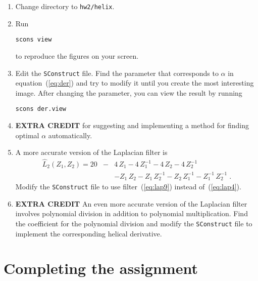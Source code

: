 \begin{enumerate}
\item Change directory to \texttt{hw2/helix}.
\item Run 
\begin{verbatim}
scons view
\end{verbatim}
to reproduce the figures on your screen.
\item Edit the \texttt{SConstruct} file. Find the parameter that corresponds to $\alpha$ in equation~(\ref{eq:der}) and try to modify it until you create the most interesting image. After changing the parameter, you can view the result by running
\begin{verbatim}
scons der.view
\end{verbatim}
\item \textbf{EXTRA CREDIT} for suggesting and implementing a method for finding optimal $\alpha$ automatically.
\item A more accurate version of the Laplacian filter is
\begin{eqnarray}
\nonumber
\hat{L}_2(Z_1,Z_2) = 20 & - & 4\,Z_1 - 4\,Z_1^{-1} - 4\,Z_2 - 4\,Z_2^{-1} \\
&  & - Z_1\,Z_2 - Z_1\,Z_2^{-1} - Z_2\,Z_1^{-1} - Z_1^{-1}\,Z_2^{-1}\;.
\label{eq:lap9}
\end{eqnarray}
Modify the \texttt{SConstruct} file to use filter~(\ref{eq:lap9}) instead of~(\ref{eq:lap4}).
\item  \textbf{EXTRA CREDIT} An even more accurate version of the Laplacian filter involves polynomial division in addition to polynomial multiplication. Find the coefficient for the polynomial division and modify the \texttt{SConstruct} file to implement the corresponding helical derivative.
\end{enumerate}

\lstset{language=python,numbers=left,numberstyle=\tiny,showstringspaces=false}



\section{Completing the assignment}

